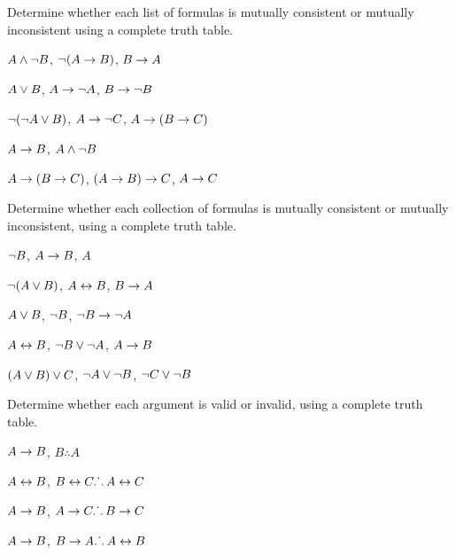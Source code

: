 \documentclass[PHIL101-Textbook.tex]{subfiles}
\begin{document}
\noindent\problempart
\label{pr.TT.consistent2}
Determine whether each list of formulas is mutually consistent or mutually inconsistent using a complete truth table. 
\begin{earg}
\item $A \land \neg B$, $\neg(A \rightarrow B)$, $B \rightarrow A$\vspace{.5ex} %
\item $A \vee B$, $A \rightarrow \neg A$, $B \rightarrow \neg B$ \vspace{.5ex} %
\item $\neg(\neg A \vee B) $, $A \rightarrow \neg C$, $A \rightarrow (B \rightarrow C)$\vspace{.5ex} %
\item $A \rightarrow B$, $A \land \neg B$\vspace{.5ex} %
\item $A \rightarrow (B \rightarrow C)$, $(A \rightarrow B) \rightarrow C$, $A \rightarrow C$\vspace{.5ex} %

\end{earg}

\noindent\problempart
\label{pr.TT.consistent3}
Determine whether each collection of formulas is mutually consistent or mutually inconsistent, using a complete truth table. 
\begin{earg}
\item $\neg B$, $A \rightarrow B$, $A$ \vspace{.5ex}%
\item $\neg(A \vee B)$, $A \leftrightarrow B$, $B \rightarrow A$\vspace{.5ex} %
\item $A \vee B$, $\neg B$, $\neg B \rightarrow \neg A$\vspace{.5ex} %
\item $A \leftrightarrow B$, $\neg B \vee \neg A$, $A \rightarrow B$\vspace{.5ex} %
\item $(A \vee B) \vee C$, $\neg A \vee \neg B$, $\neg C \vee \neg B$\vspace{.5ex} %
\end{earg}


\noindent\problempart
\label{pr.TT.valid2}
Determine whether each argument is valid or invalid, using a complete truth table. 
\begin{earg}
\item $A\rightarrow B$, $B \therefore  A$ \vspace{.5ex} %
\item $A\leftrightarrow B$, $B\leftrightarrow C \ldotp\dot{}\,\ldotp A\leftrightarrow C$ \vspace{.5ex} %
\item $A \rightarrow B$, $A \rightarrow C\ldotp\dot{}\,\ldotp B \rightarrow C$ \vspace{.5ex} %
\item $A \rightarrow B$, $B \rightarrow A\ldotp\dot{}\,\ldotp A \leftrightarrow B$ \vspace{.5ex} %
\end{earg}
\end{document}
